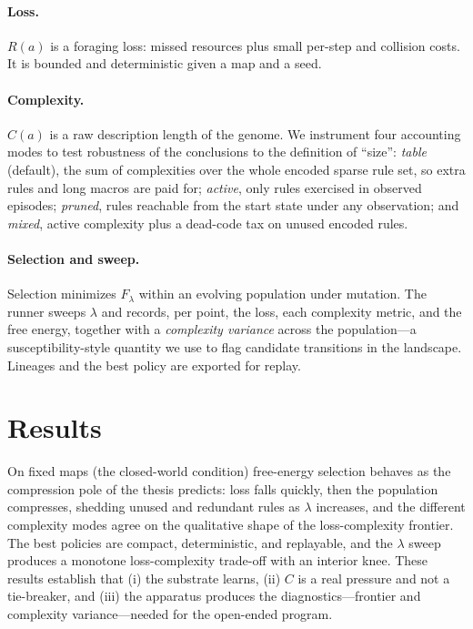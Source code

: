 \documentclass[11pt]{article}
\begin{document}
\paragraph{Loss.}
$R(a)$ is a foraging loss: missed resources plus small per-step and collision costs. It
is bounded and deterministic given a map and a seed.

\paragraph{Complexity.}
$C(a)$ is a raw description length of the genome. We instrument four accounting modes to
test robustness of the conclusions to the definition of ``size'':
\emph{table} (default), the sum of complexities over the whole encoded sparse rule set,
so extra rules and long macros are paid for; \emph{active}, only rules exercised in
observed episodes; \emph{pruned}, rules reachable from the start state under any
observation; and \emph{mixed}, active complexity plus a dead-code tax on unused encoded
rules.

\paragraph{Selection and sweep.}
Selection minimizes $F_\lambda$ within an evolving population under mutation. The runner
sweeps $\lambda$ and records, per point, the loss, each complexity metric, and the
free energy, together with a \emph{complexity variance} across the population---a
susceptibility-style quantity we use to flag candidate transitions in the landscape.
Lineages and the best policy are exported for replay.

\section{Results}
On fixed maps (the closed-world condition) free-energy selection behaves as the
compression pole of the thesis predicts: loss falls quickly, then the population
compresses, shedding unused and redundant rules as $\lambda$ increases, and the
different complexity modes agree on the qualitative shape of the loss-complexity
frontier. The best policies are compact, deterministic, and replayable, and the
$\lambda$ sweep produces a monotone loss-complexity trade-off with an interior knee.
These results establish that (i) the substrate learns, (ii) $C$ is a real pressure and
not a tie-breaker, and (iii) the apparatus produces the diagnostics---frontier and
complexity variance---needed for the open-ended program.
\end{document}
